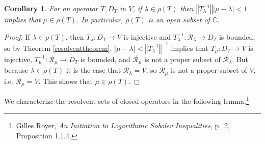 \documentclass{article}
\newcommand{\norm}[1]{\left\Vert #1 \right\Vert}
\newtheorem{corollary}[theorem]{Corollary}
\theoremstyle{definition}
\begin{document}
\begin{corollary}
For an operator $T,D_T$ in $V$, 
if $\lambda \in \rho(T)$ then $\norm{T_\lambda^{-1}} |\mu - \lambda| < 1$ implies that $\mu \in \rho(T)$. 
In particular,  $\rho(T)$ is an open subset of $\mathbb{C}$. 
\label{resolventopen}
\end{corollary}
\begin{proof}
If $\lambda \in \rho(T)$, then $T_\lambda:D_T \to V$ is injective and $T_\lambda^{-1}:\mathscr{R}_\lambda \to D_T$ is bounded,
so
by Theorem \ref{resolventtheorem},  
$|\mu - \lambda| < \norm{T_\lambda^{-1}}^{-1}$ implies that $T_\mu:D_T \to V$ is injective,
$T_\mu^{-1}:\mathscr{R}_\mu \to D_T$ is bounded, and $\overline{\mathscr{R}_\mu}$ is not a proper subset of $\overline{\mathscr{R}_\lambda}$.
But because $\lambda \in \rho(T)$ it is the case that $\overline{\mathscr{R}_\lambda}=V$, so
$\overline{\mathscr{R}_\mu}$ is not a proper subset of $V$, i.e. $\overline{\mathscr{R}_\mu}=V$. This shows that
$\mu \in \rho(T)$. 
\end{proof}



We characterize the resolvent sets of closed operators in the following lemma.\footnote{Gilles Royer,
{\em An Initiation to Logarithmic Sobolev Inequalities}, p.~2, Proposition 1.1.4.}
\end{document}
